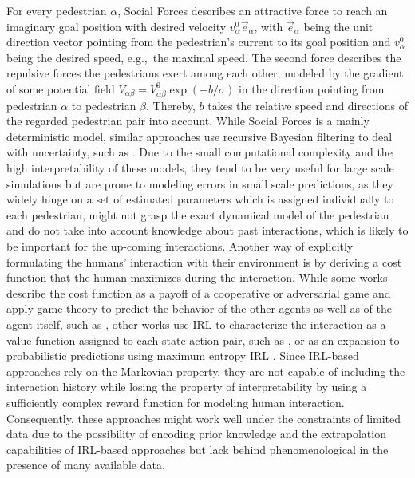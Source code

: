 For every pedestrian $\alpha$, Social Forces describes an attractive force to reach an imaginary goal position with desired velocity $v^0_{\alpha} \vec{e}_{\alpha}$, with $\vec{e}_{\alpha}$ being the unit direction vector pointing from the pedestrian's current to its goal position and $v^0_{\alpha}$ being the desired speed, e.g.,\ the maximal speed. The second force describes the repulsive forces the pedestrians exert among each other, modeled by the gradient of some potential field $V_{\alpha \beta} = V_{\alpha \beta}^0 \exp(-b / \sigma)$ in the direction pointing from pedestrian $\alpha$ to pedestrian $\beta$. Thereby, $b$ takes the relative speed and directions of the regarded pedestrian pair into account. While Social Forces is a mainly deterministic model, similar approaches use recursive Bayesian filtering to deal with uncertainty, such as \cite{Schneider2013}\cite{Rehder2015}\cite{Guo2016}. Due to the small computational complexity and the high interpretability of these models, they tend to be very useful for large scale simulations but are prone to modeling errors in small scale predictions, as they widely hinge on a set of estimated parameters which is assigned individually to each pedestrian, might not grasp the exact dynamical model of the pedestrian and do not take into account knowledge about past interactions, which is likely to be important for the up-coming interactions.
\newline
Another way of explicitly formulating the humans' interaction with their environment is by deriving a cost function that the human maximizes during the interaction. While some works describe the cost function as a payoff of a cooperative or adversarial game and apply game theory to predict the behavior of the other agents as well as of the agent itself, such as \cite{Bouzat2014}\cite{Nikolaidis2017}, other works use \ac{IRL} \cite{Ng2000} to characterize the interaction as a value function assigned to each state-action-pair, such as \cite{Fahad2018}\cite{Fernando2019}\cite{Saleh2018}, or as an expansion to probabilistic predictions using maximum entropy \ac{IRL} \cite{Ziebart2008}. Since IRL-based approaches rely on the Markovian property, they are not capable of including the interaction history while losing the property of interpretability by using a sufficiently complex reward function for modeling human interaction. Consequently, these approaches might work well under the constraints of limited data due to the possibility of encoding prior knowledge and the extrapolation capabilities of \ac{IRL}-based approaches but lack behind phenomenological in the presence of many available data.

